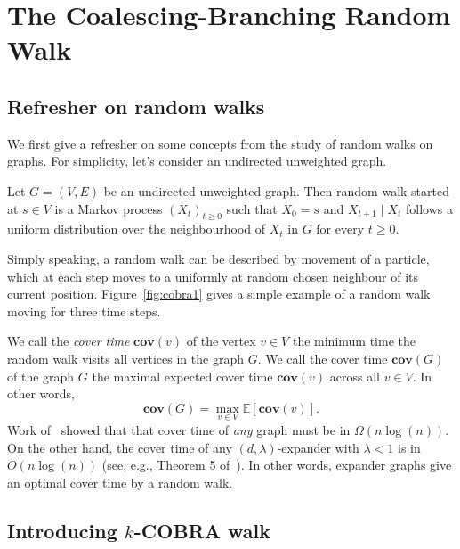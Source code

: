 \documentclass[11pt]{article}
\newcommand{\cov}{\mathbf{cov}}
\newcommand{\E}{\mathbb E}
\theoremstyle{remark}
\begin{document}
\newcommand{\coursenum}{{CSC 2421H}}
\newcommand{\coursename}{{Graphs, Matrices, and Optimization}}
\newcommand{\courseprof}{Sushant Sachdeva}


\section{The Coalescing-Branching Random Walk}

\subsection{Refresher on random walks}

We first give a refresher on some concepts from the study of random walks on graphs. For simplicity, let's consider an undirected unweighted graph.

\begin{definition}
\label{def:random-walk}
    Let $G = (V,E)$ be an undirected unweighted graph. Then random walk started at $s \in V$ is a Markov process $(X_t)_{t \ge 0}$ such that $X_0 = s$ and $X_{t+1} \mid X_t$ follows a uniform distribution over the neighbourhood of $X_t$ in $G$ for every $t \ge 0$.
\end{definition}

Simply speaking, a random walk can be described by movement of a particle, which at each step moves to a uniformly at random chosen neighbour of its current position. Figure~\ref{fig:cobra1} gives a simple example of a random walk moving for three time steps. 

We call the \emph{cover time} $\cov(v)$ of the vertex $v \in V$ the minimum time the random walk visits all vertices in the graph $G$. We call the cover time $\cov(G)$ of the graph $G$ the maximal expected cover time $\cov(v)$ across all $v \in V$. In other words,
\[
\cov(G) = \max_{v \in V} \E\left[\cov(v)\right].
\]
Work of~\cite{Aldous1989LowerBF} showed that that cover time of \emph{any} graph must be in $\Omega(n\log(n))$. On the other hand, the cover time of any $(d,\lambda)$-expander with $\lambda < 1$ is in $O(n\log(n))$ (see, e.g., Theorem 5 of~\cite{Broder1988BoundsOT}). In other words, expander graphs give an optimal cover time by a random walk.

\subsection{Introducing $k$-COBRA walk}
\end{document}

